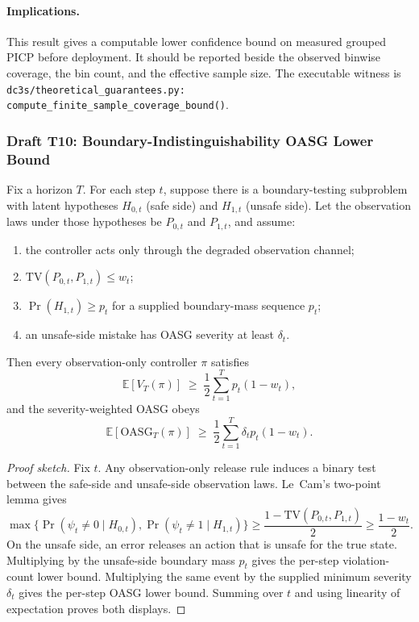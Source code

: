 \paragraph{Implications.}
This result gives a computable lower confidence bound on measured grouped PICP
before deployment.  It should be reported beside the observed binwise coverage,
the bin count, and the effective sample size.  The executable witness is
\texttt{dc3s/theoretical\_guarantees.py:
compute\_finite\_sample\_coverage\_bound()}.

\subsubsection{Draft T10: Boundary-Indistinguishability OASG Lower Bound}

\begin{theorem}\label{thm:deep-separation}
Fix a horizon $T$.  For each step $t$, suppose there is a boundary-testing
subproblem with latent hypotheses $H_{0,t}$ (safe side) and $H_{1,t}$ (unsafe
side).  Let the observation laws under those hypotheses be $P_{0,t}$ and
$P_{1,t}$, and assume:
\begin{enumerate}[label=(\roman*),leftmargin=*]
  \item the controller acts only through the degraded observation channel;
  \item $\mathrm{TV}(P_{0,t},P_{1,t})\le w_t$;
  \item $\Pr(H_{1,t})\ge p_t$ for a supplied boundary-mass sequence $p_t$;
  \item an unsafe-side mistake has OASG severity at least $\delta_t$.
\end{enumerate}
Then every observation-only controller $\pi$ satisfies
\[
  \mathbb{E}[V_T(\pi)]
  \;\ge\;
  \frac{1}{2}\sum_{t=1}^T p_t(1-w_t),
\]
and the severity-weighted OASG obeys
\[
  \mathbb{E}[\mathrm{OASG}_T(\pi)]
  \;\ge\;
  \frac{1}{2}\sum_{t=1}^T \delta_t p_t(1-w_t).
\]
\end{theorem}

\begin{proof}[Proof sketch]
Fix $t$.  Any observation-only release rule induces a binary test between the
safe-side and unsafe-side observation laws.  Le~Cam's two-point lemma gives
\[
  \max\{\Pr(\psi_t\ne 0\mid H_{0,t}),\Pr(\psi_t\ne 1\mid H_{1,t})\}
  \ge \frac{1-\mathrm{TV}(P_{0,t},P_{1,t})}{2}
  \ge \frac{1-w_t}{2}.
\]
On the unsafe side, an error releases an action that is unsafe for the true
state.  Multiplying by the unsafe-side boundary mass $p_t$ gives the per-step
violation-count lower bound.  Multiplying the same event by the supplied
minimum severity $\delta_t$ gives the per-step OASG lower bound.  Summing over
$t$ and using linearity of expectation proves both displays.
\end{proof}


